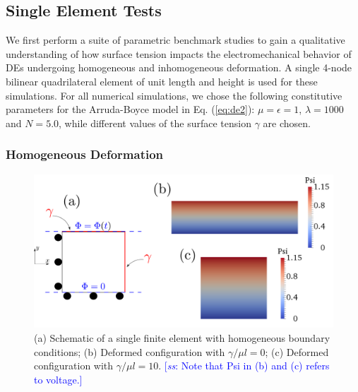 \documentclass[final,authoryear,3p,times]{elsarticle}
\newcommand{\hsp}[1]{\textcolor{blue}{[\textit{ss}: #1]}}
\begin{document}
\subsection{Single Element Tests}

We first perform a suite of parametric benchmark studies to gain a qualitative understanding of how surface tension impacts the electromechanical behavior of DEs undergoing homogeneous and inhomogeneous deformation.  A single 4-node bilinear quadrilateral element of unit length and height is used for these simulations.  For all numerical simulations, we chose the following constitutive parameters for the Arruda-Boyce model in Eq. (\ref{eq:de2}):  $\mu=\epsilon=1$, $\lambda=1000$ and $N=5.0$, while different values of the surface tension $\gamma$ are chosen. 

\subsubsection{Homogeneous Deformation}

\begin{figure} \begin{center} 
\includegraphics[scale=0.25]{pics/homo3.pdf}
\caption{(a) Schematic of a single finite element with homogeneous boundary conditions; (b) Deformed configuration with $\gamma/\mu l=0$; (c) Deformed configuration with $\gamma/\mu l=10$.  \hsp{Note that Psi in (b) and (c) refers to voltage.}}
\label{homo3} \end{center} \end{figure}
\end{document}

